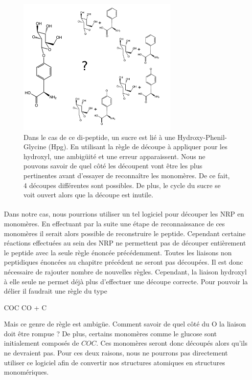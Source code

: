 \documentclass[12pt,french,twoside]{report}
\begin{document}
\begin{figure}[!h]
  \begin{center}
    \includegraphics[width=300px]{Figures/s2m/Intro/molBlocks_problem.png}
    \caption{\label{molBlocks_problem}Dans le cas de ce di-peptide, un sucre est lié à une Hydroxy-Phenil-Glycine (Hpg).
    En utilisant la règle de découpe à appliquer pour les hydroxyl, une ambigüité et une erreur apparaissent.
    Nous ne pouvons savoir de quel côté les découpent vont être les plus pertinentes avant d'essayer de reconnaître les monomères.
    De ce fait, 4 découpes différentes sont possibles.
    De plus, le cycle du sucre se voit ouvert alors que la découpe est inutile.}
  \end{center}
\end{figure}

\paragraph{}Dans notre cas, nous pourrions utiliser un tel logiciel pour découper les NRP en monomères.
En effectuant par la suite une étape de reconnaissance de ces monomères il serait alors possible de reconstruire le peptide.
Cependant certaine réactions effectuées au sein des NRP ne permettent pas de découper entièrement le peptide avec la seule règle énoncée précédemment.
Toutes les liaisons non peptidiques énoncées au chapitre précédent ne seront pas découpées.
Il est donc nécessaire de rajouter nombre de nouvelles règles.
Cependant, la liaison hydroxyl à elle seule ne permet déjà plus d'effectuer une découpe correcte.
Pour pouvoir la délier il faudrait une règle du type
\begin{chemmath}
  COC \longrightarrow CO + C
\end{chemmath}
Mais ce genre de règle est ambigüe.
Comment savoir de quel côté du O la liaison doit être rompue ?
De plus, certains monomères comme le glucose sont initialement composés de $COC$.
Ces monomères seront donc découpés alors qu'ils ne devraient pas.
Pour ces deux raisons, nous ne pourrons pas directement utiliser ce logiciel afin de convertir nos structures atomiques en structures monomériques.
\end{document}
